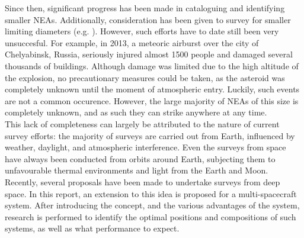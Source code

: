 Since then, significant progress has been made in cataloguing and identifying smaller NEAs. Additionally, consideration has been given to survey for smaller limiting diameters (e.g. \cite{2003NEOSDT}). However, such efforts have to date still been very unsuccesful. For example, in 2013, a meteoric airburst over the city of Chelyabinsk, Russia, seriously injured almost 1500 people and damaged several thousands of buildings. Although damage was limited due to the high altitude of the explosion, no precautionary measures could be taken, as the asteroid was completely unknown until the moment of atmospheric entry. Luckily, such events are not a common occurence. However, the large majority of NEAs of this size is completely unknown, and as such they can strike anywhere at any time. \\

This lack of completeness can largely be attributed to the nature of current survey efforts: the majority of surveys are carried out from Earth, influenced by weather, daylight, and atmospheric interference. Even the surveys from space have always been conducted from orbits around Earth, subjecting them to unfavourable thermal environments and light from the Earth and Moon. Recently, several proposals have been made to undertake surveys from deep space. In this report, an extension to this idea is proposed for a multi-spacecraft system. After introducing the concept, and the various advantages of the system, research is performed to identify the optimal positions and compositions of such systems, as well as what performance to expect.

